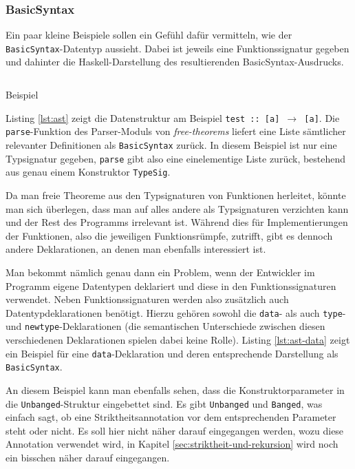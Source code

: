 \subsubsection{BasicSyntax}

Ein paar kleine Beispiele sollen ein Gefühl dafür vermitteln, wie der \texttt{BasicSyntax}-Datentyp aussieht. Dabei ist jeweils
eine Funktionssignatur gegeben und dahinter die Haskell-Darstellung des resultierenden BasicSyntax-Ausdrucks.

\begin{listing}[ht]
\inputminted[tabsize=2]{haskell}{ast.hs}
\caption{Beispiel}
\label{lst:ast}
\end{listing}

Listing \ref{lst:ast} zeigt die Datenstruktur am Beispiel \texttt{test :: [a] $\rightarrow$ [a]}. Die \texttt{parse}-Funktion des Parser-Moduls von \textit{free-theorems} liefert eine Liste sämtlicher relevanter Definitionen als \texttt{BasicSyntax} zurück.
In diesem Beispiel ist nur eine Typsignatur gegeben, \texttt{parse} gibt also eine einelementige Liste zurück, bestehend aus
genau einem Konstruktor \texttt{TypeSig}.

Da man freie Theoreme aus den Typsignaturen von Funktionen herleitet, könnte man sich überlegen, dass man auf alles andere
als Typsignaturen verzichten kann und der Rest des Programms irrelevant ist. Während dies für Implementierungen der Funktionen,
also die jeweiligen Funktionsrümpfe, zutrifft, gibt es dennoch andere Deklarationen, an denen man ebenfalls interessiert ist.

Man bekommt nämlich genau dann ein Problem, wenn der Entwickler im Programm eigene Datentypen deklariert und diese in
den Funktionssignaturen verwendet. Neben Funktionssignaturen werden also zusätzlich auch Datentypdeklarationen benötigt.
Hierzu gehören sowohl die \texttt{data}- als auch \texttt{type}- und \texttt{newtype}-Deklarationen (die semantischen Unterschiede
zwischen diesen verschiedenen Deklarationen spielen dabei keine Rolle). Listing \ref{lst:ast-data} zeigt ein Beispiel für eine
\texttt{data}-Deklaration und deren entsprechende Darstellung als \texttt{BasicSyntax}.

An diesem Beispiel kann man ebenfalls sehen, dass die Konstruktorparameter in die \texttt{Unbanged}-Struktur eingebettet sind.
Es gibt \texttt{Unbanged} und \texttt{Banged}, was einfach sagt, ob eine Striktheitsannotation vor dem entsprechenden
Parameter steht oder nicht. Es soll hier nicht näher darauf eingegangen werden, wozu diese Annotation verwendet wird, in
Kapitel \ref{sec:striktheit-und-rekursion} wird noch ein bisschen näher darauf eingegangen.

